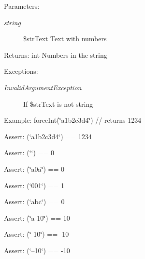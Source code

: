 \begin{Desc}
\item[Parameters:]
\begin{description}
\item[{\em string}]\$strText Text with numbers \end{description}
\end{Desc}
\begin{Desc}
\item[Returns:]int Numbers in the string \end{Desc}
\begin{Desc}
\item[Exceptions:]
\begin{description}
\item[{\em InvalidArgumentException}]If \$strText is not string \end{description}
\end{Desc}
\begin{Desc}
\item[Example:]forceInt(\char`\"{}a1b2c3d4\char`\"{}) // returns 1234\end{Desc}
\begin{Desc}
\item[Assert:](\char`\"{}a1b2c3d4\char`\"{}) == 1234 \end{Desc}
\begin{Desc}
\item[Assert:](\char`\"{}\char`\"{}) == 0 \end{Desc}
\begin{Desc}
\item[Assert:](\char`\"{}a0a\char`\"{}) == 0 \end{Desc}
\begin{Desc}
\item[Assert:](\char`\"{}001\char`\"{}) == 1 \end{Desc}
\begin{Desc}
\item[Assert:](\char`\"{}abc\char`\"{}) == 0 \end{Desc}
\begin{Desc}
\item[Assert:](\char`\"{}a-10\char`\"{}) == 10\end{Desc}
\begin{Desc}
\item[Assert:](\char`\"{}-10\char`\"{}) == -10 \end{Desc}
\begin{Desc}
\item[Assert:](\char`\"{}--10\char`\"{}) == -10 \end{Desc}
